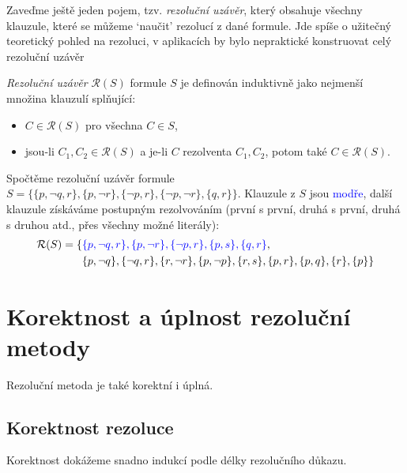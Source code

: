 Zaveďme ještě jeden pojem, tzv. \emph{rezoluční uzávěr}, který obsahuje všechny klauzule, které se můžeme `naučit' rezolucí z dané formule. Jde spíše o užitečný teoretický pohled na rezoluci, v aplikacích by bylo nepraktické konstruovat celý rezoluční uzávěr

\begin{definition}
\emph{Rezoluční uzávěr} $\mathcal R(S)$ formule $S$ je definován induktivně jako nejmenší množina klauzulí splňující:
\begin{itemize}
    \item $C\in\mathcal R(S)$ pro všechna $C\in S$,
    \item jsou-li $C_1,C_2\in\mathcal R(S)$ a je-li $C$ rezolventa $C_1,C_2$, potom také $C\in\mathcal R(S)$.
\end{itemize}
\end{definition}

\begin{example}
    Spočtěme rezoluční uzávěr formule $S=\{\{p,\neg q,r\},\{p,\neg r\},\{\neg p,r\},\{\neg p,\neg r\},\{q,r\}\}$. Klauzule z $S$ jsou \textcolor{blue}{modře}, další klauzule získáváme postupným rezolvováním (první s první, druhá s první, druhá s druhou atd., přes všechny možné literály):
    \begin{align*}
        \mathcal R(S)=\{&\textcolor{blue}{\{p,\neg q,r\},\{p,\neg r\},\{\neg p,r\},\{p,s\},\{q,r\}},\\&\{p,\neg q\},\{\neg q,r\},\{r,\neg r\},\{p,\neg p\},\{r,s\},\{p,r\},\{p,q\},\{r\},\{p\}\}
    \end{align*}
\end{example}

\section{Korektnost a úplnost rezoluční metody}

Rezoluční metoda je také korektní i úplná. 

\subsection{Korektnost rezoluce}

Korektnost dokážeme snadno indukcí podle délky rezolučního důkazu.

